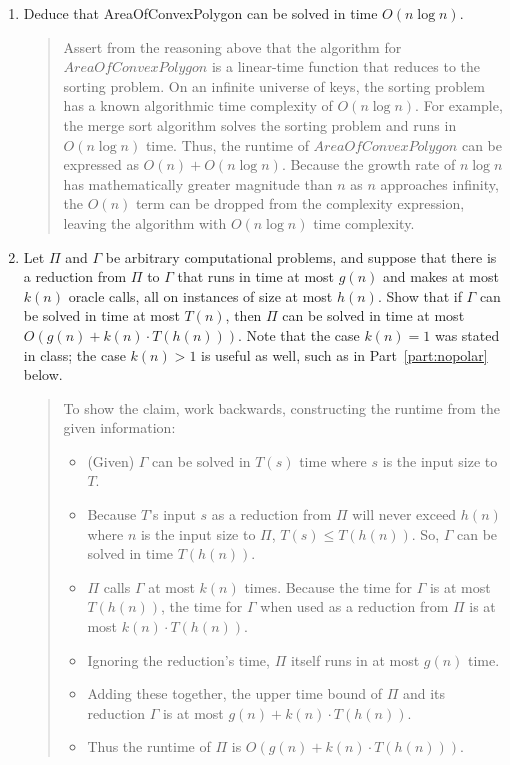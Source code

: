 \documentclass[11pt]{article}
\begin{document}
\begin{enumerate}
\begin{enumerate}
        \item Deduce that AreaOfConvexPolygon can be solved in time $O(n\log n)$.
        \begin{quote}
            \color{purple}
            Assert from the reasoning above that the algorithm for $AreaOfConvexPolygon$ is a linear-time function that reduces to the sorting problem. \newline 
            On an infinite universe of keys, the sorting problem has a known algorithmic time complexity of $O(n \log n)$. For example, the merge sort algorithm solves the sorting problem and runs in $O(n \log n)$ time. \newline 
            Thus, the runtime of $AreaOfConvexPolygon$ can be expressed as $O(n) + O(n \log n)$. Because the growth rate of $n \log n$ has mathematically greater magnitude than $n$ as $n$ approaches infinity, the $O(n)$ term can be dropped from the complexity expression, leaving the algorithm with $O(n \log n)$ time complexity.
        \end{quote}
        \item Let $\Pi$ and $\Gamma$ be arbitrary computational problems, and suppose that there is a reduction from $\Pi$ to $\Gamma$ that runs in time at most $g(n)$ and makes at most $k(n)$ oracle calls, all on instances of size at most $h(n)$.  Show that if $\Gamma$ can be solved in time at most $T(n)$, then $\Pi$ can be solved in time at most $O(g(n)+k(n)\cdot T(h(n)))$. Note that the case $k(n)=1$ was stated in class; the case $k(n)>1$ is useful as well, such as in Part~\ref{part:nopolar} below. 
        \begin{quote}
            \color{purple}
            To show the claim, work backwards, constructing the runtime from the given information:
            \begin{itemize}
                \item (Given) $\Gamma$ can be solved in $T(s)$ time where $s$ is the input size to $T$.
                \item Because $T$'s input $s$ as a reduction from $\Pi$ will never exceed $h(n)$ where $n$ is the input size to $\Pi$, $T(s) \leq T(h(n))$. So, $\Gamma$ can be solved in time $T(h(n))$.
                \item $\Pi$ calls $\Gamma$ at most $k(n)$ times. Because the time for $\Gamma$ is at most $T(h(n))$, the time for $\Gamma$ when used as a reduction from $\Pi$ is at most $k(n) \cdot T(h(n))$.
                \item Ignoring the reduction's time, $\Pi$ itself runs in at most $g(n)$ time.
                \item Adding these together, the upper time bound of $\Pi$ and its reduction $\Gamma$ is at most $g(n) + k(n) \cdot T(h(n))$.
                \item Thus the runtime of $\Pi$ is $O(g(n) + k(n) \cdot T(h(n)))$.
            \end{itemize}
        \end{quote}
        

\end{enumerate}
\end{enumerate}
\end{document}
